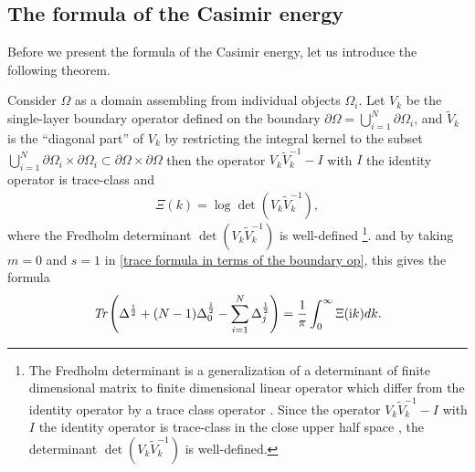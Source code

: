 \subsection{The formula of the Casimir energy}
Before we present the formula of the Casimir energy, let us introduce the following theorem.
\begin{theorem}\cite{MR4484208}
    Consider $\Omega$ as a domain assembling from individual objects $\Omega_{i}$. Let $V_{k}$ be the single-layer boundary operator defined on the boundary 
    $\partial\Omega = \bigcup_{i = 1}^{N}\partial\Omega_{i}$, and $\tilde{V}_{k}$ is the ``diagonal part'' of $V_{k}$ by restricting the integral 
    kernel to the subset $\bigcup_{i = 1}^{N}\partial\Omega_{i}\times\partial\Omega_{i}\subset\partial\Omega\times\partial\Omega$ then the operator 
    $V_{k}\tilde{V}_{k}^{-1} - I$ with $I$ the identity operator is trace-class and 
    \begin{align*}
        \Xi(k) = \log\det\left(V_{k}\tilde{V}_{k}^{-1}\right),
    \end{align*}
    where the Fredholm determinant $\det(V_{k}\tilde{V}_{k}^{-1})$ is well-defined 
    \footnote{The Fredholm determinant is a generalization of a determinant of finite dimensional matrix to finite dimensional linear operator 
    which differ from the identity operator by a trace class operator \cite[Section 6.5.2]{MR2300779}. Since the operator $V_{k}\tilde{V}_{k}^{-1} - I$ 
    with $I$ the identity operator is trace-class in the close upper half space \cite[Theorem 1.7]{MR4484208}, the determinant $\det(V_{k}\tilde{V}_{k}^{-1})$ is well-defined.}.
   and by taking $m = 0$ and $s = 1$ in \eqref{trace formula in terms of the boundary op}, this gives the formula 
    \begin{align}\label{slp and matrix}
        \emph{\text{Tr}}\left(\Delta^{\frac{1}{2}} + (N - 1)\Delta_{0}^{\frac{1}{2}} - \sum_{i = 1}^{N}\Delta_{j}^{\frac{1}{2}}\right)  =  \frac{1}{\pi}\int_{0}^{\infty}\Xi(\mathrm{i}k)dk.
    \end{align}
\end{theorem}

